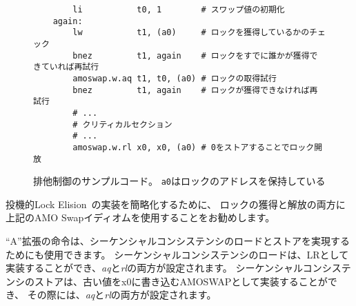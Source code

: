 \begin{figure}[h!]
\begin{center}
\begin{verbatim}
        li           t0, 1        # スワップ値の初期化
    again:
        lw           t1, (a0)     # ロックを獲得しているかのチェック
        bnez         t1, again    # ロックをすでに誰かが獲得できていれば再試行
        amoswap.w.aq t1, t0, (a0) # ロックの取得試行
        bnez         t1, again    # ロックが獲得できなければ再試行
        # ...
        # クリティカルセクション
        # ...
        amoswap.w.rl x0, x0, (a0) # 0をストアすることでロック開放
\end{verbatim}
\end{center}
\caption{排他制御のサンプルコード。 {\tt a0}はロックのアドレスを保持している}
\label{critical}
\end{figure}

\begin{commentary}
\begin{comment}
We recommend the use of the AMO Swap idiom shown above for both lock
acquire and release to simplify the implementation of speculative lock
elision~\cite{Rajwar:2001:SLE}.
\end{comment}

投機的Lock Elision~\cite{Rajwar:2001:SLE}の実装を簡略化するために、
ロックの獲得と解放の両方に上記のAMO Swapイディオムを使用することをお勧めします。
\end{commentary}

\begin{comment}
The instructions in the ``A'' extension can also be used to provide
sequentially consistent loads and stores.  A sequentially consistent load can
be implemented as an LR with both {\em aq} and {\em rl} set. A sequentially
consistent store can be implemented as an AMOSWAP that writes the old value to
x0 and has both {\em aq} and {\em rl} set.
\end{comment}

``A''拡張の命令は、シーケンシャルコンシステンシのロードとストアを実現するためにも使用できます。
シーケンシャルコンシステンシのロードは、LRとして実装することができ、{\em aq}と{\em rl}の両方が設定されます。
シーケンシャルコンシステンシのストアは、古い値をx0に書き込むAMOSWAPとして実装することができ、
その際には、{\em aq}と{\em rl}の両方が設定されます。
